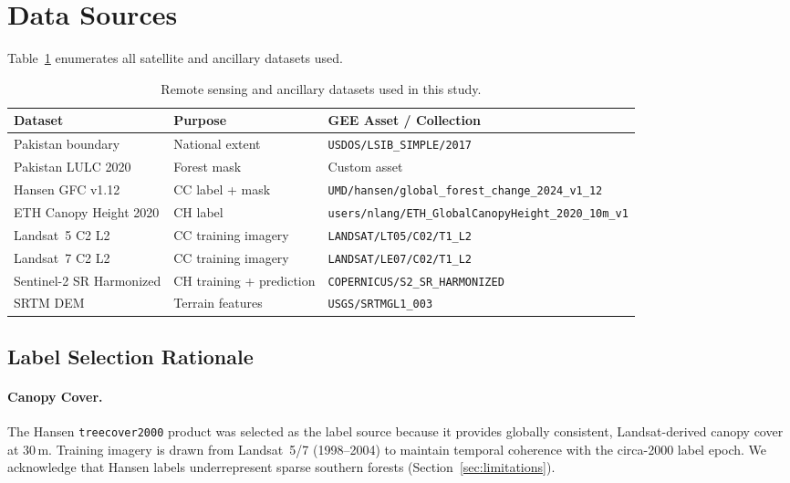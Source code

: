 \documentclass[12pt,a4paper,twoside]{article}
\begin{document}
\section{Data Sources}\label{sec:data}

Table~\ref{tab:data_sources} enumerates all satellite and ancillary datasets used.

\begin{table}[H]
\centering
\caption{Remote sensing and ancillary datasets used in this study.}
\label{tab:data_sources}
\small
\begin{tabularx}{\textwidth}{@{}l l X@{}}
\toprule
\textbf{Dataset} & \textbf{Purpose} & \textbf{GEE Asset / Collection} \\
\midrule
Pakistan boundary & National extent & \texttt{USDOS/LSIB\_SIMPLE/2017} \\
Pakistan LULC 2020 & Forest mask & Custom asset \\
Hansen GFC v1.12 & CC label + mask & \texttt{UMD/hansen/global\_forest\_change\_2024\_v1\_12} \\
ETH Canopy Height 2020 & CH label & \texttt{users/nlang/ETH\_GlobalCanopyHeight\_2020\_10m\_v1} \\
Landsat~5 C2 L2 & CC training imagery & \texttt{LANDSAT/LT05/C02/T1\_L2} \\
Landsat~7 C2 L2 & CC training imagery & \texttt{LANDSAT/LE07/C02/T1\_L2} \\
Sentinel-2 SR Harmonized & CH training + prediction & \texttt{COPERNICUS/S2\_SR\_HARMONIZED} \\
SRTM DEM & Terrain features & \texttt{USGS/SRTMGL1\_003} \\
\bottomrule
\end{tabularx}
\end{table}

\subsection{Label Selection Rationale}

\paragraph{Canopy Cover.}
The Hansen \texttt{treecover2000} product \citep{Hansen2013} was selected as the
label source because it provides globally consistent, Landsat-derived canopy cover
at 30\,m.  Training imagery is drawn from Landsat~5/7 (1998--2004) to maintain
temporal coherence with the circa-2000 label epoch. We acknowledge that Hansen
labels underrepresent sparse southern forests (Section~\ref{sec:limitations}).
\end{document}
